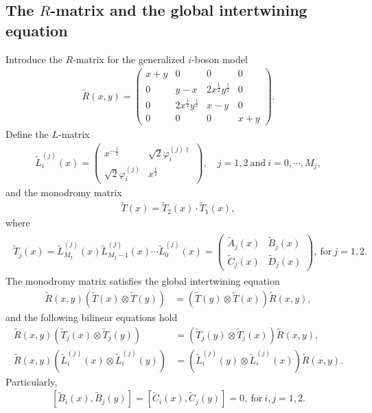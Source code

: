 \documentclass[11pt,reqno]{amsart}
\numberwithin{equation}{section}
\begin{document}
	\subsection{The $R$-matrix and the global intertwining equation}
	Introduce the  $R$-matrix for the   generalized $i$-boson  model
	\begin{align}
		\tilde{R}(x, y) =
		\begin{pmatrix}
			x + y & 0 & 0 & 0 \\
			0 & y - x & 2x^{\frac{1}{2}}y^{\frac{1}{2}} & 0 \\
			0 & 2x^{\frac{1}{2}}y^{\frac{1}{2}} & x - y & 0 \\
			0 & 0 & 0 & x + y
		\end{pmatrix}.
	\end{align}
	Define the $L$-matrix
	\begin{align}\label{L-j}
		\tilde{L}_{i}^{(j)}(x)=
		\begin{pmatrix}
			x^{-\frac{1}{2}} &  \sqrt{2}\varphi_i^{(j)\dagger} \\
			\sqrt{2}\varphi_i^{(j)} & x^{\frac{1}{2}}
		\end{pmatrix}, \quad j=1,2\mathrm{~and~}i=0,\cdots,M_j,
	\end{align}
	and the monodromy matrix		
	\begin{align}
		\tilde{T}(x)=\tilde{T}_{2}(x) \cdot \tilde{T}_{1}(x),
	\end{align}
	where	
	\begin{align}\label{T-j}
		\begin{aligned}
			\tilde{T}_{j}(x) =\tilde{L}_{M_{j}}^{(j)}(x)\tilde{L}_{M_{j}-1}^{(j)}(x)\cdots \tilde{L}_{0}^{(j)}(x)
			=
			\begin{pmatrix}
				\tilde{A}_j(x) & \tilde{B}_j(x) \\
				\tilde{C}_j(x) & \tilde{D}_j(x)
			\end{pmatrix}, \mathrm{~for~} j=1,2.
		\end{aligned}
	\end{align}
	The monodromy matrix satisfies the global intertwining equation
	\begin{align}
		\tilde{R}(x,y)(\tilde{T}(x)\otimes \tilde{T}(y))&=(\tilde{T}(y)\otimes \tilde{T}(x))\tilde{R}(x,y),
	\end{align}
	and the following bilinear equations  hold
	\begin{align}
		\tilde{R}(x,y)(\tilde{T}_{j}(x)\otimes \tilde{T}_{j}(y))&=(\tilde{T}_{j}(y)\otimes \tilde{T}_{j}(x))\tilde{R}(x,y),\\
		\tilde{R}(x,y)(\tilde{L}_{i}^{(j)}(x)\otimes \tilde{L}_{i}^{(j)}(y))&=(\tilde{L}_{i}^{(j)}(y)\otimes \tilde{L}_{i}^{(j)}(x))\tilde{R}(x,y). \label{bilinear-3}
	\end{align}
	Particularly,
	\begin{align}\label{B,C,commute}
		[\tilde{B}_i(x),\tilde{B}_j(y)]=[\tilde{C}_i(x),\tilde{C}_j(y)]=0, \mathrm{~for~} i,j=1,2.
	\end{align}
	
\end{document}
